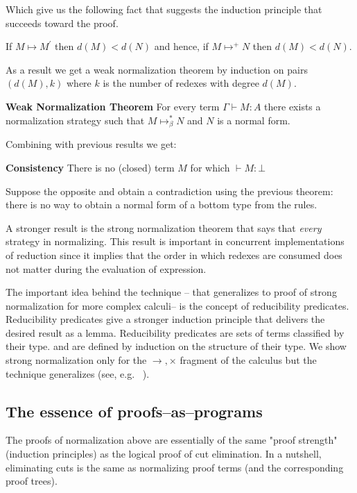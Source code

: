 Which give us the following fact that suggests the induction principle that succeeds toward the proof.
\begin{mdframed}
	\begin{theorem}
If $M\mapsto M^{\prime}$ then $d(M)<d(N)$ and hence, if $M\mapsto^{+} N$ then $d(M)<d(N)$.
\end{theorem}
\end{mdframed}
As a result we get a weak  normalization theorem by induction on pairs $(d(M),k)$ where $k$ is the number of redexes with degree $d(M)$.
\begin{mdframed}
\begin{theorem}
	\textbf{Weak Normalization Theorem}
For every term $\Gamma\vdash M:A$ there exists a normalization strategy such that $M\mapsto_{\beta}^{*}N$ and $N$ is a normal form.
\end{theorem}
\end{mdframed} 

Combining with previous results we get:
\begin{theorem}
\begin{mdframed}
\textbf{Consistency}
There is no (closed) term $M$ for which $\vdash M:\bot$ 
\end{mdframed}
\end{theorem}
 Suppose the opposite and obtain a contradiction using the previous theorem: there is no way to obtain a normal form of a bottom type from the rules.  
 
 A stronger result is the strong normalization theorem that says that \textit{every} strategy 
 in normalizing. This result is important in concurrent implementations of reduction since 
 it implies that the order in which redexes are consumed does 
 not matter during the evaluation of  expression. 
 
 The important idea behind the technique -- that generalizes to proof of 
 strong normalization for more complex calculi-- is the concept of  reducibility predicates. 
 Reducibility predicates give a stronger induction principle that delivers the desired 
 result as a lemma.  Reducibility predicates are sets of terms classified by their type.
 and are defined by induction on the structure of their type. 
 We show strong normalization only for the $\rightarrow, \times$ fragment 
 of the calculus but the technique generalizes (see, e.g. ~\cite{prawitz1971ideas}). 
 

\subsection{The essence of proofs--as--programs }
The proofs of normalization above are essentially of the same "proof strength" (induction principles) as the logical proof of cut elimination. In a nutshell, eliminating cuts is the same as normalizing proof terms (and the corresponding proof trees).

